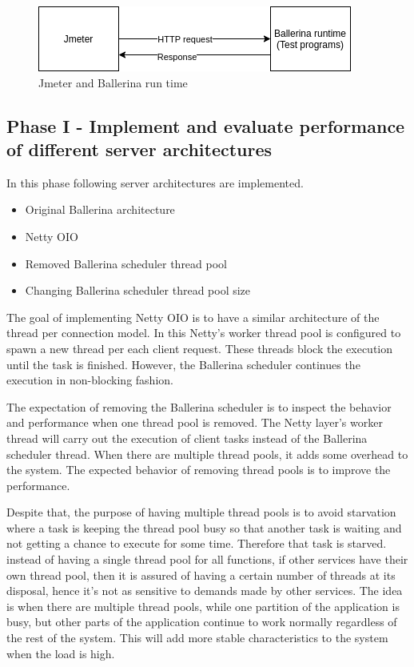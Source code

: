 \begin{figure}[htbp]
	\begin{center}
		\includegraphics[scale=0.5]{figures/jmeter_bal.png}
	\end{center}
	\caption{Jmeter and Ballerina run time}
	\label{jmeter_testing}
\end{figure}



\subsection{Phase I - Implement and evaluate performance of different server architectures}

In this phase following server architectures are implemented. 

 \begin{itemize}
 	\item Original Ballerina architecture
 	\item Netty OIO
 	\item Removed Ballerina scheduler thread pool
 	\item Changing Ballerina scheduler thread pool size
 \end{itemize} 

The goal of implementing Netty OIO is to have a similar architecture of the thread per connection model. In this Netty's worker thread pool is configured to spawn a new thread per each client request. These threads block the execution until the task is finished. However, the Ballerina scheduler continues the execution in non-blocking fashion.

The expectation of removing the Ballerina scheduler is to inspect the behavior and performance when one thread pool is removed. The Netty layer's worker thread will carry out the execution of client tasks instead of the Ballerina scheduler thread. When there are multiple thread pools, it adds some overhead to the system. The expected behavior of removing thread pools is to improve the performance.  

Despite that, the purpose of having multiple thread pools is to avoid starvation where a task is keeping the thread pool busy so that another task is waiting and not getting a chance to execute for some time. Therefore that task is starved. instead of having a single thread pool for all functions, if other services have their own thread pool, then it is assured of having a certain number of threads at its disposal, hence it's not as sensitive to demands made by other services. The idea is when there are multiple thread pools, while one partition of the application is busy, but other parts of the application continue to work normally regardless of the rest of the system. This will add more stable characteristics to the system when the load is high.


